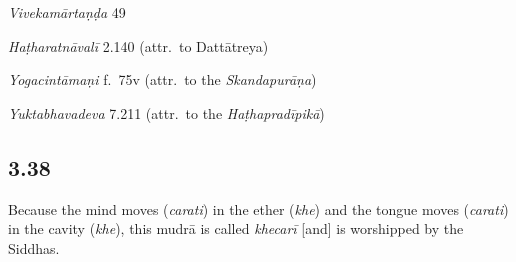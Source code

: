\begin{ekdosis}
\begin{sources}[hp03_037]
\emph{Vivekamārtaṇḍa} 49
\begin{versinnote}
\end{versinnote}
\end{sources}

\begin{testimonia}[hp03_037]
\emph{Haṭharatnāvalī} 2.140 (attr.~to Dattātreya)
\begin{versinnote}
\end{versinnote}

\emph{Yogacintāmaṇi} f.~75v (attr.~to the \emph{Skandapurāṇa})
\begin{versinnote}
\end{versinnote}

\emph{Yuktabhavadeva} 7.211 (attr.~to the \emph{Haṭhapradīpikā})
\begin{versinnote}
\end{versinnote}
\end{testimonia}


\subsection*{3.38}
\begin{translation}[hp03_038]
Because the mind moves (\emph{carati}) in the ether (\emph{khe}) and the tongue moves (\emph{carati}) in the cavity (\emph{khe}), this mudrā is called \emph{khecarī} [and] is worshipped by the Siddhas.
\end{translation}


\end{ekdosis}
